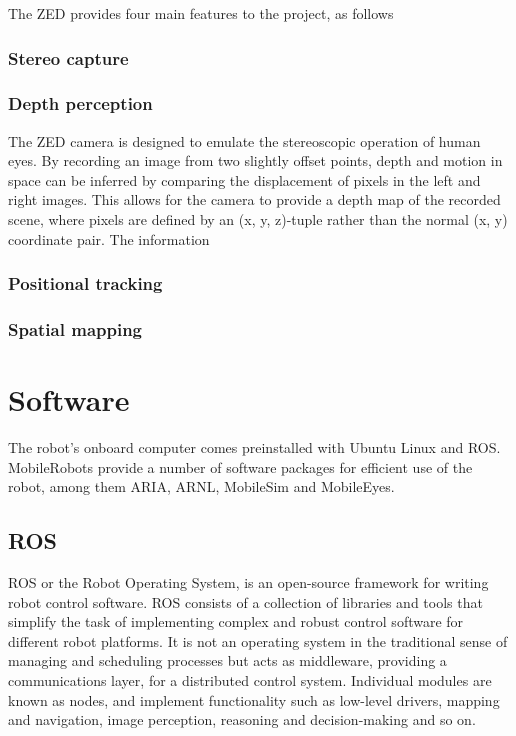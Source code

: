 \documentclass[\rootfolder/main.tex]{subfiles}
\begin{document}
The ZED provides four main features to the project, as follows

\subsubsection{Stereo capture}

\subsubsection{Depth perception}

The ZED camera is designed to emulate the stereoscopic operation of human eyes.
By recording an image from two slightly offset points, depth and motion in space can be inferred by comparing the displacement of pixels in the left and right images.
This allows for the camera to provide a depth map of the recorded scene, where pixels are defined by an (x, y, z)-tuple rather than the normal (x, y) coordinate pair.
The information 

\subsubsection{Positional tracking}

\subsubsection{Spatial mapping}

\section{Software}

The robot's onboard computer comes preinstalled with Ubuntu Linux and ROS.
MobileRobots provide a number of software packages for efficient use of the robot, among them ARIA, ARNL, MobileSim and MobileEyes.

\subsection{ROS}

ROS or the Robot Operating System, is an open-source framework for writing robot control software.
ROS consists of a collection of libraries and tools that simplify the task of implementing complex and robust control software for different robot platforms.
It is not an operating system in the traditional sense of managing and scheduling processes but acts as middleware, providing a communications layer, for a distributed control system.
Individual modules are known as nodes, and implement functionality such as low-level drivers, mapping and navigation, image perception, reasoning and decision-making and so on.
\end{document}
